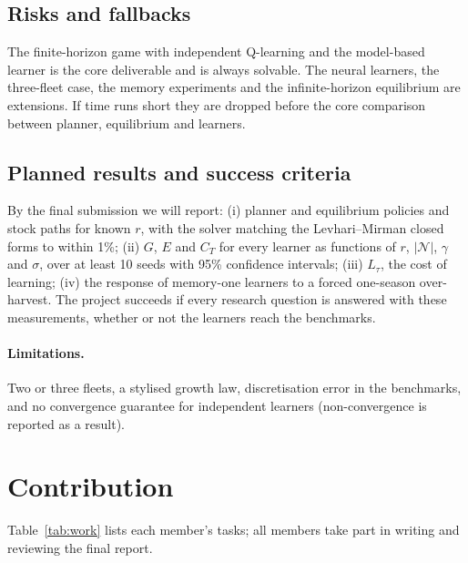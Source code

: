 \documentclass{article}
\begin{document}
\subsection{Risks and fallbacks}
The finite-horizon game with independent Q-learning and the model-based learner is the core deliverable and is always solvable. The neural learners, the three-fleet case, the memory experiments and the infinite-horizon equilibrium are extensions. If time runs short they are dropped before the core comparison between planner, equilibrium and learners.

\subsection{Planned results and success criteria}
By the final submission we will report: (i) planner and equilibrium policies and stock paths for known $r$, with the solver matching the Levhari--Mirman closed forms to within 1\%; (ii) $G$, $E$ and $C_T$ for every learner as functions of $r$, $|\mathcal N|$, $\gamma$ and $\sigma$, over at least 10 seeds with 95\% confidence intervals; (iii) $L_\tau$, the cost of learning; (iv) the response of memory-one learners to a forced one-season over-harvest. The project succeeds if every research question is answered with these measurements, whether or not the learners reach the benchmarks.

\paragraph{Limitations.} Two or three fleets, a stylised growth law, discretisation error in the benchmarks, and no convergence guarantee for independent learners (non-convergence is reported as a result).

\section{Contribution}
\label{sec:contrib}
Table~\ref{tab:work} lists each member's tasks; all members take part in writing and reviewing the final report.
\end{document}
